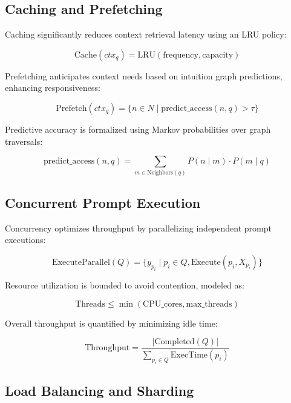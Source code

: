 \documentclass[11pt,a4paper]{article}
\begin{document}
\subsection{Caching and Prefetching}
\label{subsec:caching_prefetching}

Caching significantly reduces context retrieval latency using an LRU policy:

\[
\text{Cache}(ctx_q)=\text{LRU}(\text{frequency},\text{capacity})
\]

Prefetching anticipates context needs based on intuition graph predictions, enhancing responsiveness:

\[
\text{Prefetch}(ctx_q)=\{n\in N\mid\text{predict\_access}(n,q)>\tau\}
\]

Predictive accuracy is formalized using Markov probabilities over graph traversals:

\[
\text{predict\_access}(n,q)=\sum_{m\in\text{Neighbors}(q)}P(n\mid m)\cdot P(m\mid q)
\]

\subsection{Concurrent Prompt Execution}
\label{subsec:concurrent_execution}

Concurrency optimizes throughput by parallelizing independent prompt executions:

\[
\text{ExecuteParallel}(Q)=\{y_{p_i}\mid p_i\in Q,\text{Execute}(p_i,X_{p_i})\}
\]

Resource utilization is bounded to avoid contention, modeled as:

\[
\text{Threads}\leq\min(\text{CPU\_cores},\text{max\_threads})
\]

Overall throughput is quantified by minimizing idle time:

\[
\text{Throughput}=\frac{|\text{Completed}(Q)|}{\sum_{p_i\in Q}\text{ExecTime}(p_i)}
\]

\subsection{Load Balancing and Sharding}
\label{subsec:load_balancing}
\end{document}
